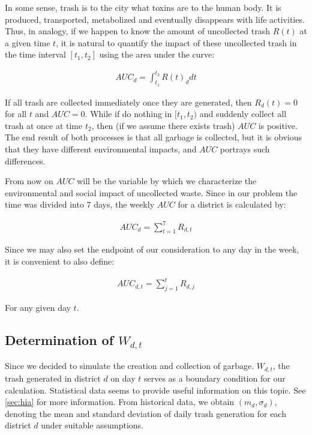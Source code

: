 \documentclass{article}
\begin{document}
In some sense, trash is to the city what toxins are to the human body. It is produced, transported, metabolized and eventually disappears with life activities. Thus, in analogy, if we happen to know the amount of uncollected trash $R(t)$ at a given time $t$, it is natural to quantify the impact of these uncollected trash in the time interval $[t_1, t_2]$ using the area under the curve:


\begin{align}
	AUC_d = \int_{t_1}^{t_2} R(t)_d dt \label{eq:AUC}
\end{align}

 If all trash are collected immediately once they are generated, then $ R_d(t) = 0$ for all $ t$ and $ AUC = 0$. While if do nothing in $[t_1, t_2)$ and suddenly collect all trash at once at time $ t_2$, then (if we assume there exists trash) $ AUC$ is positive. The end result of both processes is that all garbage is collected, but it is obvious that they have different environmental impacts, and $AUC$ portrays such differences.


From now on $AUC$ will be the variable by which we characterize the environmental and social impact of uncollected waste. Since in our problem the time was divided into 7 days, the weekly $ AUC$ for a district is calculated by:


\begin{align}
AUC_{d} = \sum_{t = 1}^{7} R_{d,t}	
\end{align}

Since we may also set the endpoint of our consideration to any day in the week, it is convenient to also define:

\begin{align}
    AUC_{d,t} = \sum_{j = 1}^{t} R_{d,j}
\end{align}

For any given day $t$.

\subsection{Determination of $W_{d,t}$}

Since we decided to simulate the creation and collection of garbage. $W_{d,t}$, the trash generated in district $d$ on day $t$ serves as a boundary condition for our calculation. Statistical data seems to provide useful information on this topic. See \cref{sec:hia} for more information. From historical data, we obtain $(m_d, \sigma_d)$, denoting the mean and standard deviation of daily trash generation for each district $d$ under suitable assumptions.
\end{document}
